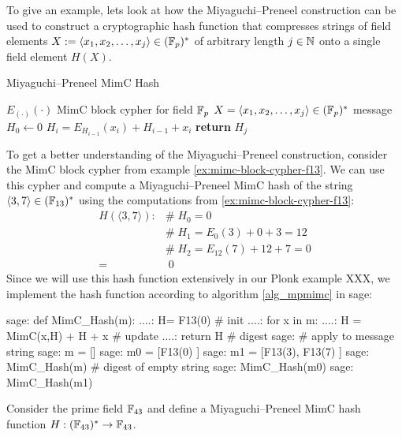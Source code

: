 To give an example, lets look at how the Miyaguchi–Preneel construction can be used to construct a cryptographic hash function that compresses strings of field elements $X:=\langle x_1,x_2,\ldots, x_j\rangle\in (\mathbb{F}_p)^*$ of arbitrary length $j\in \mathbb{N}$ onto a single field element $H(X)$.
\begin{algorithm}\caption{Miyaguchi–Preneel MimC Hash}
\label{alg_mpmimc}
\begin{algorithmic}[0]
\Require $E_{(\cdot)}(\cdot)$ MimC block cypher for field $\mathbb{F}_p$
\Require $X=\langle x_1,x_2,\ldots, x_j\rangle\in (\mathbb{F}_p)^*$ message 
\State $H_0 \gets 0$ 
	\State $H_i = E_{H_{i-1}}(x_i) + H_{i-1} + x_i $ 
\EndFor
\State \textbf{return} $H_j$ 
\EndProcedure
\end{algorithmic}
\end{algorithm}
\begin{example}
\label{ex:mimc-hash-f13} To get a better understanding of the Miyaguchi–Preneel construction, consider the MimC block cypher from example \ref{ex:mimc-block-cypher-f13}. We can use this cypher and compute a Miyaguchi–Preneel MimC hash of the string $\langle 3, 7\rangle\in (\mathbb{F}_{13})^*$ using the computations from \ref{ex:mimc-block-cypher-f13}:
\begin{align*}
H(\langle 3, 7\rangle): & \#\; H_0 = 0\\
                        & \#\; H_1 = E_0(3) + 0 + 3 = 12 \\
                        & \#\; H_2 = E_{12}(7) + 12 + 7 = 0 \\
                       = &\;  0
\end{align*}
Since we will use this hash function extensively in our Plonk example XXX, we implement the hash function according to algorithm \ref{alg_mpmimc} in sage:
\begin{sagecommandline}
sage: def MimC_Hash(m):
....:     H= F13(0) # init
....:     for x in m:
....:         H = MimC(x,H) + H + x # update
....:     return H # digest
sage: # apply to message string 
sage: m = []
sage: m0 = [F13(0) ]
sage: m1 = [F13(3), F13(7) ]
sage: MimC_Hash(m) # digest of empty string
sage: MimC_Hash(m0)
sage: MimC_Hash(m1)
\end{sagecommandline}
\end{example}
\begin{exercise}
\label{ex:mimc-f43}
Consider the prime field $\mathbb{F}_{43}$ and define a Miyaguchi–Preneel MimC hash function $H: (\mathbb{F}_{43})^*\to \mathbb{F}_{43}$.
\end{exercise}
